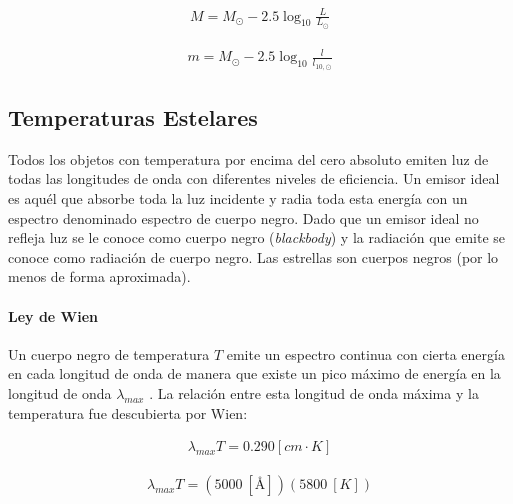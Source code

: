 \documentclass{tufte-handout}
\begin{document}
\begin{align}
  M = M_{\odot} - 2.5 \log_{10}\frac{L}{L_{\odot}}
\end{align}

\begin{align}
  m = M_{\odot} - 2.5 \log_{10}\frac{l}{l_{10, \odot}}
\end{align}

\subsection{Temperaturas Estelares}

Todos los objetos con temperatura por encima del cero absoluto emiten luz de todas las longitudes de onda con diferentes niveles de eficiencia. Un emisor ideal es aquél que absorbe toda la luz incidente y radia toda esta energía con un espectro denominado espectro de cuerpo negro. Dado que un emisor ideal no refleja luz se le conoce como cuerpo negro (\emph{blackbody}) y la radiación que emite se conoce como radiación de cuerpo negro. Las estrellas son cuerpos negros (por lo menos de forma aproximada).

\paragraph{Ley de Wien}

Un cuerpo negro de temperatura $T$ emite un espectro continua con cierta energía en cada longitud de onda de manera que existe un pico máximo de energía en la longitud de onda $\lambda_{max}$ . La relación entre esta longitud de onda máxima y la temperatura fue descubierta por Wien:

\begin{align}
  \lambda_{max} T = 0.290 [cm \cdot K]
\end{align}

\begin{align}
  \lambda_{max} T = (5000~[\si{\angstrom}])(5800~[K])
\end{align}

\end{document}
